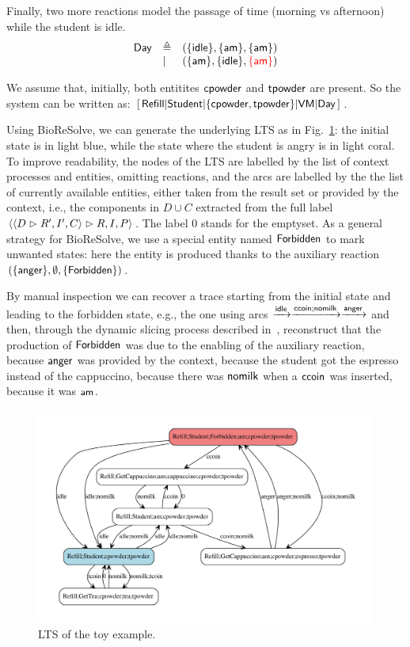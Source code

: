 Finally, two more reactions model the passage of time (morning vs afternoon) while the student is idle.
\[
\begin{array}{lll}
\mathsf{Day} & \triangleq & (\{\mathsf{idle}\},\{\mathsf{am}\},\{\mathsf{am}\})\\
& | & (\{\mathsf{am}\},\{\mathsf{idle}\},\textcolor{red}{\{\mathsf{am}\}})
\end{array}
\]

We assume that, initially, both entitites $\mathsf{cpowder}$ and $\mathsf{tpowder}$ are present.
So the system can be written as:
\(
[\,\mathsf{Refill}
| \mathsf{Student}
| \{\mathsf{cpowder},\mathsf{tpowder}\} 
| \mathsf{VM}
| \mathsf{Day}\,]
\).

Using BioReSolve, we can generate the underlying LTS as in Fig.~\ref{fig:toylts}: the initial state is in light blue, while the state where the student is angry is in light coral.
To improve readability, the nodes of the LTS are labelled by the list of context processes and entities, omitting reactions, and the arcs are labelled by the the list of currently available entities, either taken from the result set or provided by the context, i.e., the components in $D\cup C$ extracted from the full label $\langle \langle D\vartriangleright R',I',C\rangle\vartriangleright R,I,P\rangle$. The label $0$ stands for the emptyset.
As a general strategy for BioReSolve, we use a special entity named ${\text{\sffamily Forbidden}}$ to mark unwanted states: here the entity is produced thanks to the auxiliary reaction $(\{{\text{\sffamily anger}}\},\emptyset,\{{\text{\sffamily Forbidden}}\})$.

By manual inspection we can recover a trace starting from the initial state and leading to the forbidden state, e.g., the one using arcs $\xrightarrow{\mathsf{idle}}\xrightarrow{\mathsf{ccoin};\mathsf{nomilk}}\xrightarrow{{\text{\sffamily anger}}}$ and then, through the dynamic slicing process described in~\cite{DBLP:journals/nc/BrodoBF24}, reconstruct that the production of ${\text{\sffamily Forbidden}}$ was due to the enabling of the auxiliary reaction, because ${\text{\sffamily anger}}$ was provided by the context, because the student got the espresso instead of the cappuccino, because there was $\mathsf{nomilk}$ when a $\mathsf{ccoin}$ was inserted, because it was $\mathsf{am}$. 

\begin{figure}
\includegraphics[scale=.3]{./figs/toylts}
\caption{LTS of the toy example.\label{fig:toylts}}
\end{figure}